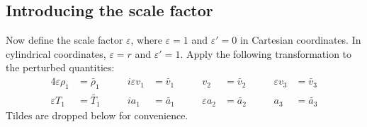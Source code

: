 \documentclass[11pt, fleqn]{article}
\newcommand{\eps}{\varepsilon}
\begin{document}
\subsection{Introducing the scale factor}
Now define the scale factor $\eps$, where $\eps = 1$ and $\eps' = 0$ in Cartesian coordinates. In cylindrical coordinates, $\eps = r$ and $\eps' = 1$. Apply the following transformation to the perturbed quantities:
\begin{alignat*}{4}
	\eps \rho_1 &= \widetilde{\rho_1}		\qquad	&	i\eps v_1 &= \widetilde{v_1}		\qquad&		v_2 		  &= \widetilde{v_2}		\qquad&			\eps v_3 &= \widetilde{v_3}			\\
	\eps T_1	&= \widetilde{T_1}					&		i a_1 &= \widetilde{a_1}			  &		\eps a_2	  &= \widetilde{a_2}			  &			a_3 	 &= \widetilde{a_3}
\end{alignat*}
Tildes are dropped below for convenience.
\begingroup
\allowdisplaybreaks
\end{document}
